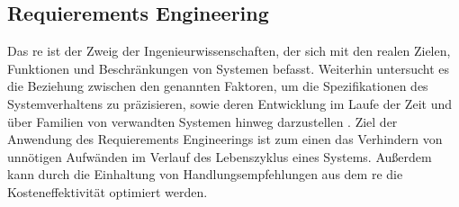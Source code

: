 \documentclass[../../../Bachelorarbeit.tex]{subfiles}
\begin{document}
 

\subsection{Requierements Engineering}
Das \ac{re} ist der Zweig der Ingenieurwissenschaften, der sich mit den realen Zielen, Funktionen und Beschränkungen von Systemen befasst. Weiterhin untersucht es die Beziehung zwischen den genannten Faktoren, um die Spezifikationen des Systemverhaltens zu präzisieren, sowie deren Entwicklung im Laufe der Zeit und über Familien von verwandten Systemen hinweg darzustellen \cite[2-3]{Laplante2014}. Ziel der Anwendung des Requierements Engineerings ist zum einen das Verhindern von unnötigen Aufwänden im Verlauf des Lebenszyklus eines Systems. Außerdem kann durch die Einhaltung von Handlungsempfehlungen aus dem \acs{re} die Kosteneffektivität optimiert werden.
\end{document}
